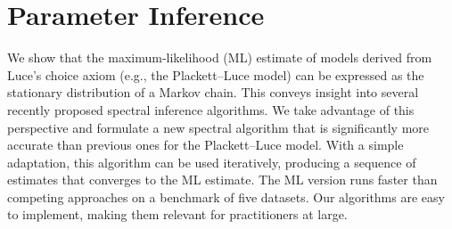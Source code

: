 \chapter{Parameter Inference}
\label{ch:fastinference}

We show that the maximum-likelihood (ML) estimate of models derived from Luce's choice axiom (e.g., the Plackett--Luce model) can be expressed as the stationary distribution of a Markov chain.
This conveys insight into several recently proposed spectral inference algorithms.
We take advantage of this perspective and formulate a new spectral algorithm that is significantly more accurate than previous ones for the Plackett--Luce model.
With a simple adaptation, this algorithm can be used iteratively, producing a sequence of estimates that converges to the ML estimate.
The ML version runs faster than competing approaches on a benchmark of five datasets.
Our algorithms are easy to implement, making them relevant for practitioners at large.









